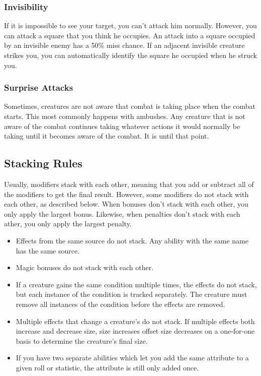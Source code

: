         \subsubsection{Invisibility}\label{Invisibility}
            If it is impossible to see your target, you can't attack him normally. However, you can attack a square that you think he occupies. An attack into a square occupied by an invisible enemy has a 50\% miss chance. If an adjacent invisible creature strikes you, you can automatically identify the square he occupied when he struck you.

        \subsubsection{Surprise Attacks}\label{Surprise Attacks}
            Sometimes, creatures are not aware that combat is taking place when the combat starts. This most commonly happens with ambushes. Any creature that is not aware of the combat continues taking whatever actions it would normally be taking until it becomes aware of the combat. It is \unaware until that point.

    \subsection{Stacking Rules}\label{Stacking Rules}
        Usually, modifiers stack with each other, meaning that you add or subtract all of the modifiers to get the final result.
        However, some modifiers do not stack with each other, as described below.
        When bonuses don't stack with each other, you only apply the largest bonus.
        Likewise, when penalties don't stack with each ather, you only apply the largest penalty.


        \begin{itemize}
            \item Effects from the same source do not stack. Any ability with the same name has the same source.
            \item Magic bonuses do not stack with each other.
            \item If a creature gains the same condition multiple times, the effects do not stack, but each instance of the condition is tracked separately.
                The creature must remove all instances of the condition before the effects are removed.
            \item Multiple effects that change a creature's  do not stack.
                If multiple effects both increase and decrease size, size increases offset size decreases on a one-for-one basis to determine the creature's final size.
            \item If you have two separate abilities which let you add the same attribute to a given roll or statistic, the attribute is still only added once.
        \end{itemize}

